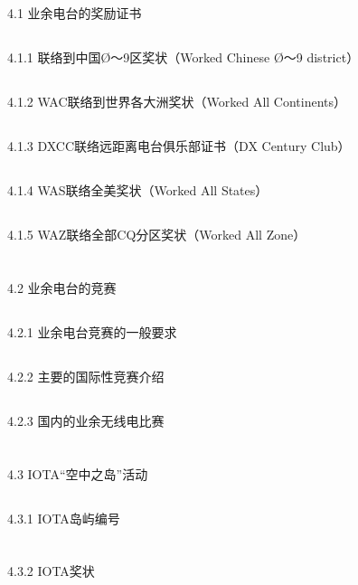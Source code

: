 \documentclass[12pt,UTF8]{ctexbook}
\begin{document}
\section{}4.1 业余电台的奖励证书
\subsection{}4.1.1 联络到中国Ø～9区奖状（Worked Chinese Ø～9 district）
\subsection{}4.1.2 WAC联络到世界各大洲奖状（Worked All Continents）
\subsection{}4.1.3 DXCC联络远距离电台俱乐部证书（DX Century Club）
\subsection{}4.1.4 WAS联络全美奖状（Worked All States）
\subsection{}4.1.5 WAZ联络全部CQ分区奖状（Worked All Zone）
\section{}4.2 业余电台的竞赛
\subsection{}4.2.1 业余电台竞赛的一般要求
\subsection{}4.2.2 主要的国际性竞赛介绍
\subsection{}4.2.3 国内的业余无线电比赛
\section{}4.3 IOTA“空中之岛”活动
\subsection{}4.3.1 IOTA岛屿编号
\section{}4.3.2 IOTA奖状
\end{document}
